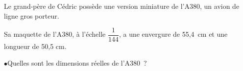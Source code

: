 \documentclass[exercice]{thedocument}%
\begin{document}
%
\begin{minipage}[t]{.5\linewidth}
    Le grand-père de Cédric possède une version miniature de l'A380, un avion
    de ligne gros porteur.
\end{minipage}%
\begin{minipage}[t]{.5\linewidth}
\end{minipage}\par\medskip\noindent
Sa maquette de l'A380, à l'échelle $\dfrac1{144}$, a une envergure de
55,4~cm et une longueur de 50,5 cm.\par\medskip\noindent
$\bullet$\quad Quelles sont les dimensions réelles de l'A380~?
\end{document}
